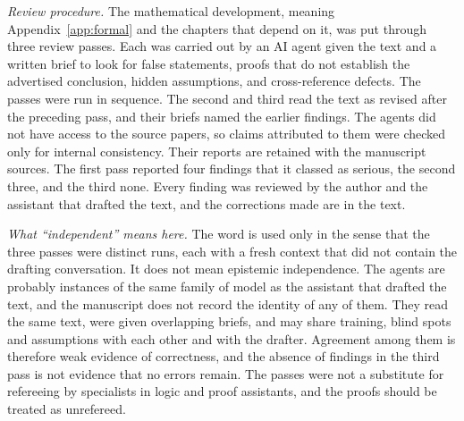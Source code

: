 \emph{Review procedure.} The mathematical development, meaning Appendix~\ref{app:formal} and the chapters that depend on it, was put through three review passes. Each was carried out by an AI agent given the text and a written brief to look for false statements, proofs that do not establish the advertised conclusion, hidden assumptions, and cross-reference defects. The passes were run in sequence. The second and third read the text as revised after the preceding pass, and their briefs named the earlier findings. The agents did not have access to the source papers, so claims attributed to them were checked only for internal consistency. Their reports are retained with the manuscript sources. The first pass reported four findings that it classed as serious, the second three, and the third none. Every finding was reviewed by the author and the assistant that drafted the text, and the corrections made are in the text.

\emph{What ``independent'' means here.} The word is used only in the sense that the three passes were distinct runs, each with a fresh context that did not contain the drafting conversation. It does not mean epistemic independence. The agents are probably instances of the same family of model as the assistant that drafted the text, and the manuscript does not record the identity of any of them. They read the same text, were given overlapping briefs, and may share training, blind spots and assumptions with each other and with the drafter. Agreement among them is therefore weak evidence of correctness, and the absence of findings in the third pass is not evidence that no errors remain. The passes were not a substitute for refereeing by specialists in logic and proof assistants, and the proofs should be treated as unrefereed.

